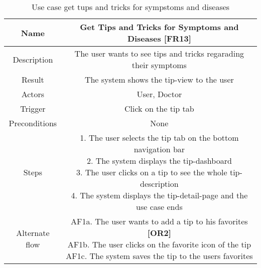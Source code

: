 \begin{table}[H]
	\begin{center}\scriptsize
		\def\arraystretch{2}%
		\begin{tabular}{ c|c } 
			\hline
			Name & Get Tips and Tricks for Symptoms and Diseases \textbf{[FR13]}\\
			\hline	
			Description & The user wants to see tips and tricks regarading their symptoms \\ 
			\hline
			Result & The system shows the tip-view to the user\\ 
			\hline
			Actors & User, Doctor \\ 
			\hline
			Trigger & Click on the tip tab\\ 
			\hline
			Preconditions & None \\ 
			\hline
			Steps & \parbox{9cm}{\vspace{.5\baselineskip}
				1. The user selects the tip tab on the bottom navigation bar\\
				2. The system displays the tip-dashboard\\
				3. The user clicks on a tip to see the whole tip-description\\
				4. The system displays the tip-detail-page and the use case ends}\\
			\hline
			Alternate flow & \parbox{9cm}{\vspace{.5\baselineskip} 
				AF1a. The user wants to add a tip to his favorites \textbf{[OR2]}\\
				AF1b. The user clicks on the favorite icon of the tip\\
				AF1c. The system saves the tip to the users favorites }\\
			\hline
		\end{tabular}\normalsize
	\end{center}
	\caption{Use case get tups and tricks for sympstoms and diseases}
\end{table}
